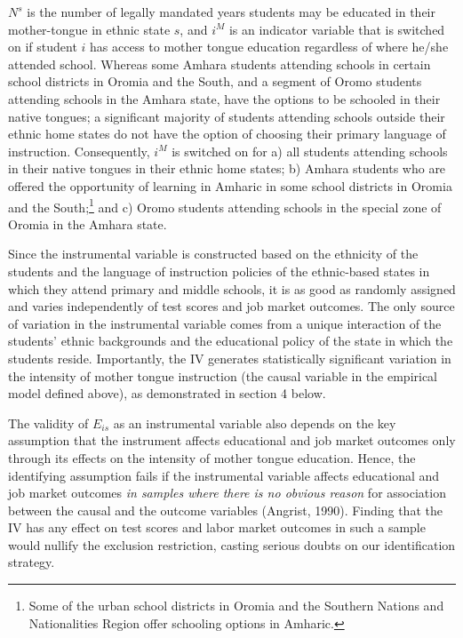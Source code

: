 $ N^{s} $ is the number of legally mandated years students may be educated in their mother-tongue in ethnic state $ s $, and $ i^{M} $ is an indicator variable that is switched on if student $ i $ has access to mother tongue education regardless of where he/she attended school. Whereas some Amhara students attending schools in certain school districts in Oromia and the South, and a segment of Oromo students attending schools in the Amhara state, have the options to be schooled in their native tongues; a significant majority of students attending schools outside their ethnic home states do not have the option of choosing their primary language of instruction. Consequently, $ i^{M} $ is switched on for a) all students attending schools in their native tongues in their ethnic home states; b) Amhara students who are offered the opportunity of learning in Amharic in some school districts in Oromia and the South;\footnote{Some of the urban school districts in Oromia and the Southern Nations and Nationalities Region offer schooling options in Amharic.} and c) Oromo students attending schools in the special zone of Oromia in the Amhara state.  

Since the instrumental variable is constructed based on the ethnicity of the students and the language of instruction policies of the ethnic-based states in which they attend primary and middle schools, it is as good as randomly assigned and varies independently of test scores and job market outcomes. The only source of variation in the instrumental variable comes from a unique interaction of the students’ ethnic backgrounds and the educational policy of the state in which the students reside. Importantly, the IV generates statistically significant variation in the intensity of mother tongue instruction (the causal variable in the empirical model defined above), as demonstrated in section 4 below. 

The validity of $ E_{is} $  as an instrumental variable also depends on the key assumption that the instrument affects educational and job market outcomes only through its effects on the intensity of mother tongue education. Hence, the identifying assumption fails if the instrumental variable affects educational and job market outcomes \textit{in samples where there is no obvious reason} for association between the causal and the outcome variables (Angrist, 1990). Finding that the IV has any effect on test scores and labor market outcomes in such a sample would nullify the exclusion restriction, casting serious doubts on our identification strategy. 

